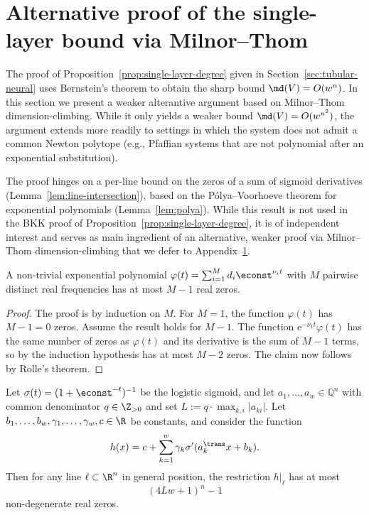 \section{Alternative proof of the single-layer bound via Milnor--Thom}\label{app:milnor-thom}

The proof of Proposition~\ref{prop:single-layer-degree} given in Section~\ref{sec:tubular-neural} uses Bernstein's theorem to obtain the sharp bound $\md(V) = O(w^n)$. In this section we present a weaker alterantive argument based on Milnor--Thom dimension-climbing. While it only yields a weaker bound $\md(V) = O(w^{n^2})$, the argument extends more readily to settings in which the system does not admit a common Newton polytope (e.g., Pfaffian systems that are not polynomial after an exponential substitution).

The proof hinges on a per-line bound on the zeros of a sum of sigmoid derivatives (Lemma~\ref{lem:line-intersection}), based on the P\'olya--Voorhoeve theorem for exponential polynomials (Lemma~\ref{lem:polya}). While this result is not used in the BKK proof of Proposition~\ref{prop:single-layer-degree}, it is of independent interest and serves as main ingredient of an alternative, weaker proof via Milnor--Thom dimension-climbing that we defer to Appendix~\ref{app:milnor-thom}.

\begin{lemma}\label{lem:polya}
    A non-trivial exponential polynomial $\varphi(t) = \sum_{i=1}^M d_i \econst^{\nu_i t}$ with $M$ pairwise distinct real frequencies has at most $M-1$ real zeros.
\end{lemma}

\begin{proof}
The proof is by induction on $M$. For $M=1$, the function $\varphi(t)$ has $M-1=0$ zeros. Assume the result holds for $M-1$. The function $\mathrm{e}^{-\nu_1 t}\varphi(t)$ has the same number of zeros as $\varphi(t)$ and its derivative is the sum of $M-1$ terms, so by the induction hypothesis has at most $M-2$ zeros. The claim now follows by Rolle's theorem.
\end{proof}

\begin{lemma}\label{lem:line-intersection}
Let $\sigma(t) = (1+\econst^{-t})^{-1}$ be the logistic sigmoid, and let $a_1,\ldots,a_w\in \mathbb{Q}^n$ with common denominator $q\in \Z_{>0}$ and set $L := q\cdot \max_{k,i}|a_{ki}|$. Let $b_1,\ldots,b_w,\gamma_1,\ldots,\gamma_w,c\in \R$ be constants, and consider the function
\begin{equation*}
  h(x) = c + \sum_{k=1}^w \gamma_k \sigma'(a_k^{\trans}x + b_k).
\end{equation*}
Then for any line $\ell\subset \R^n$ in general position, the restriction $h|_\ell$ has at most
\begin{equation*}
  (4Lw+1)^n - 1
\end{equation*}
non-degenerate real zeros.
\end{lemma}

